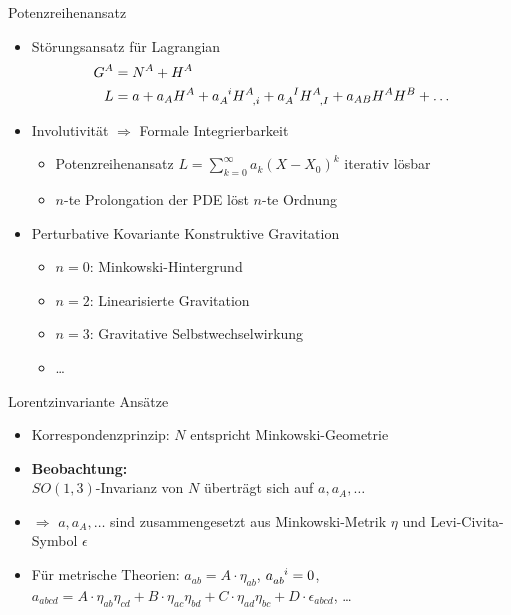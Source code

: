\documentclass{beamer}
\begin{document}
    \begin{frame}{Potenzreihenansatz}
        \begin{itemize}
            \item Störungsansatz für Lagrangian
            \setlength{\belowdisplayskip}{-10pt}
            \begin{align*}
                G^A &= N^A + H^A \\
                L &= a + a_A H^A + a_A^{\hphantom Ai} H^A_{\hphantom{A},i} + a_A^{\hphantom AI} H^A_{\hphantom{A},I} + a_{AB} H^A H^B + \ldots
            \end{align*} \pause
            \item Involutivität $\Rightarrow$ Formale Integrierbarkeit
            \begin{itemize}
                \item Potenzreihenansatz $ L = \sum_{k=0}^\infty a_k (X-X_0)^k $ iterativ lösbar
                \item \alert{$n$-te Prolongation der PDE löst $n$-te Ordnung}
            \end{itemize} \pause
            \item Perturbative Kovariante Konstruktive Gravitation
            \begin{itemize}
                \item $n=0$: Minkowski-Hintergrund
                \item $n=2$: Linearisierte Gravitation
                \item $n=3$: Gravitative Selbstwechselwirkung
                \item \ldots
            \end{itemize}
        \end{itemize}
    \end{frame}

    \begin{frame}{Lorentzinvariante Ansätze}
        \begin{itemize}
            \item Korrespondenzprinzip: $N$ entspricht Minkowski-Geometrie \pause
            \item \textbf{Beobachtung:} \\ $SO(1,3)$-Invarianz von $N$ überträgt sich auf $a, a_A, \ldots$ \pause
            \item $\Rightarrow$ $a, a_A, \ldots$ sind zusammengesetzt aus
            Minkowski-Metrik $\eta$ und Levi-Civita-Symbol $\epsilon$ \pause
            \item Für metrische Theorien: $a_{ab} = A \cdot \eta_{ab}$, $a_{ab}^{\hphantom{ab}i} = 0$, $a_{abcd} = A\cdot \eta_{ab} \eta_{cd} + B\cdot \eta_{ac} \eta_{bd} + C\cdot \eta_{ad} \eta_{bc} + D \cdot \epsilon_{abcd}$, \ldots
        \end{itemize}
    \end{frame}
\end{document}
